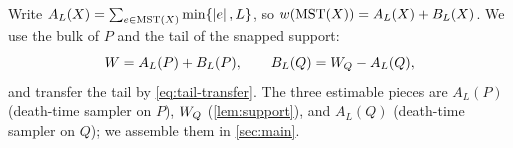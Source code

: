 Write $A_L(X)=\sum_{e\in\mathrm{MST}(X)}\min\{\left|e\right|,L\}$, so $w(\mathrm{MST}(X))=A_L(X)+B_L(X)$. We use the bulk of $P$
and the tail of the snapped support:
\begin{equation}\label{eq:decomp}
  W=A_L(P)+B_L(P),\qquad B_L(Q)=W_Q-A_L(Q),
\end{equation}
and transfer the tail by \eqref{eq:tail-transfer}. The three estimable pieces are $A_L(P)$ (death-time
sampler on $P$), $W_Q$ (\cref{lem:support}), and $A_L(Q)$ (death-time sampler on $Q$); we assemble them in
\cref{sec:main}.
